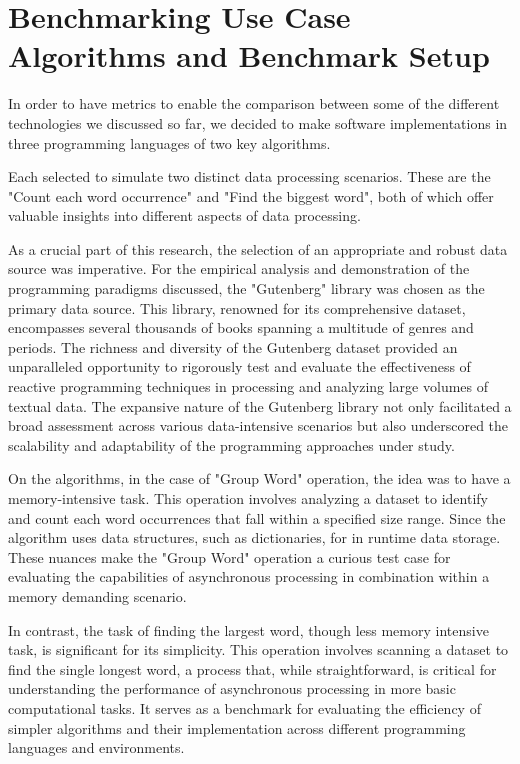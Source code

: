 

\lstset{basicstyle=\small\ttfamily, breaklines=true, frame=single}
\chapter{Benchmarking Use Case Algorithms and Benchmark Setup}
\label{cha:benchmarking_use_case_algorithms}

In order to have metrics to enable the comparison between some of the different technologies we discussed so far, we decided to make software implementations in three programming languages of two key algorithms. 

Each selected to simulate two distinct data processing scenarios. These are the "Count each word occurrence" and "Find the biggest word", both of which offer valuable insights into different aspects of data processing.

As a crucial part of this research, the selection of an appropriate and robust data source was imperative. For the empirical analysis and demonstration of the programming paradigms discussed, the "Gutenberg" \cite{gutenberg} library was chosen as the primary data source. This library, renowned for its comprehensive dataset, encompasses several thousands of books spanning a multitude of genres and periods. The richness and diversity of the Gutenberg dataset provided an unparalleled opportunity to rigorously test and evaluate the effectiveness of reactive programming techniques in processing and analyzing large volumes of textual data. The expansive nature of the Gutenberg library not only facilitated a broad assessment across various data-intensive scenarios but also underscored the scalability and adaptability of the programming approaches under study. 

On the algorithms, in the case of "Group Word" operation, the idea was to have a memory-intensive task. This operation involves analyzing a dataset to identify and count each word occurrences that fall within a specified size range. Since the algorithm uses data structures, such as dictionaries, for in runtime data storage. These nuances make the "Group Word" operation a curious test case for evaluating the capabilities of asynchronous processing in combination within a memory demanding scenario.

In contrast, the task of finding the largest word, though less memory intensive task, is significant for its simplicity. This operation involves scanning a dataset to find the single longest word, a process that, while straightforward, is critical for understanding the performance of asynchronous processing in more basic computational tasks. It serves as a benchmark for evaluating the efficiency of simpler algorithms and their implementation across different programming languages and environments.

